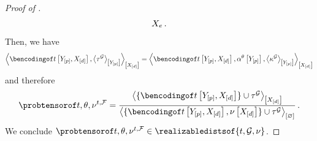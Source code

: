\begin{proof}[Proof of ]
\begin{align*}
{        }{X_{e}} \, .
    \end{align*}
    Then, we have
    \begin{align*}
        \contractionof{\bencsstatwith,\contractionof{\tnetof{\graph}}{\headvariables}}{\shortcatvariables}
        = \contractionof{\bencsstatwith,\softacttensorwith,\contractionof{\kcoreof{\graph}}{\headvariables}}{\shortcatvariables}
    \end{align*}
    and therefore
    \begin{align*}
        \expdistof{\sstat,\weightparam,\genfacemeasure}
        = \frac{
            \contractionof{\{\bencsstatwith\}\cup\tnetof{\graph}}{\shortcatvariables}
        }{
            \contraction{\{\bencsstatwith,\basemeasurewith\}\cup\tnetof{\graph}}
        } \, .
    \end{align*}
    We conclude $\expdistof{\sstat,\weightparam,\genfacemeasure}\in \realizabledistsof{\sstat,\graph,\basemeasure}$.


\end{proof}
